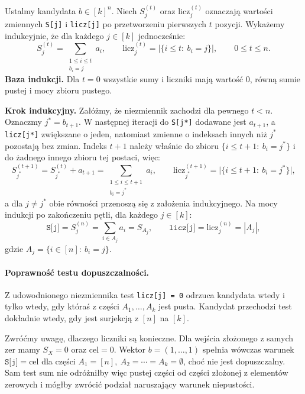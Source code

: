 \documentclass[11pt]{article}
\newcommand{\bazaind}{\noindent \textbf{Baza indukcji. }}
\newcommand{\krokind}{\noindent \textbf{Krok indukcyjny. }}
\begin{document}
Ustalmy kandydata \(b\in[k]^n\). Niech \(S_j^{(t)}\) oraz \(\mathrm{licz}_j^{(t)}\) oznaczają wartości zmiennych \texttt{S[j]} i \texttt{licz[j]} po przetworzeniu pierwszych \(t\) pozycji. Wykażemy indukcyjnie, że dla każdego \(j\in[k]\) jednocześnie:
\begin{equation}
S_j^{(t)}=\sum_{\substack{1\leq i\leq t\\b_i=j}}a_i, \qquad \mathrm{licz}_j^{(t)}=\bigl|\{i\leq t:\ b_i=j\}\bigr|, \qquad 0\leq t\leq n.
\end{equation}
\bazaind Dla \(t=0\) wszystkie sumy i liczniki mają wartość \(0\), równą sumie pustej i mocy zbioru pustego.

\krokind Załóżmy, że niezmiennik zachodzi dla pewnego \(t<n\). Oznaczmy \(j^{*}=b_{t+1}\). W następnej iteracji do \texttt{S[j*]} dodawane jest \(a_{t+1}\), a \texttt{licz[j*]} zwiększane o jeden, natomiast zmienne o indeksach innych niż \(j^{*}\) pozostają bez zmian. Indeks \(t+1\) należy właśnie do zbioru \(\{i\leq t+1:\ b_i=j^{*}\}\) i do żadnego innego zbioru tej postaci, więc:
\begin{equation}
S_{j^{*}}^{(t+1)}=S_{j^{*}}^{(t)}+a_{t+1}=\sum_{\substack{1\leq i\leq t+1\\b_i=j^{*}}}a_i, \qquad \mathrm{licz}_{j^{*}}^{(t+1)}=\bigl|\{i\leq t+1:\ b_i=j^{*}\}\bigr|,
\end{equation}
a dla \(j\neq j^{*}\) obie równości przenoszą się z założenia indukcyjnego. Na mocy indukcji po zakończeniu pętli, dla każdego \(j\in[k]\):
\begin{equation}
\texttt{S[j]}=S_j^{(n)}=\sum_{i\in A_j}a_i=S_{A_j}, \qquad \texttt{licz[j]}=\mathrm{licz}_j^{(n)}=|A_j|,
\end{equation}
gdzie \(A_j=\{i\in[n]:\ b_i=j\}\).

\paragraph{Poprawność testu dopuszczalności.}

Z udowodnionego niezmiennika test \texttt{licz[j] = 0} odrzuca kandydata wtedy i tylko wtedy, gdy któraś z części \(A_1,\ldots,A_k\) jest pusta. Kandydat przechodzi test dokładnie wtedy, gdy jest surjekcją z \([n]\) na \([k]\).

Zwróćmy uwagę, dlaczego liczniki są konieczne. Dla wejścia złożonego z samych zer mamy \(S_X=0\) oraz \(\mathrm{cel}=0\). Wektor \(b=(1,\ldots,1)\) spełnia wówczas warunek \(\texttt{S[j]}=\mathrm{cel}\) dla części \(A_1=[n],\ A_2=\cdots=A_k=\emptyset\), choć nie jest dopuszczalny. Sam test sum nie odróżniłby więc pustej części od części złożonej z elementów zerowych i mógłby zwrócić podział naruszający warunek niepustości.
\end{document}
